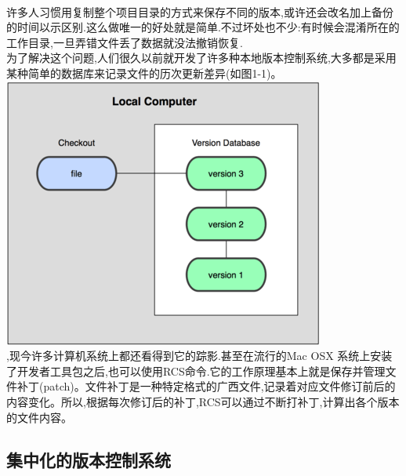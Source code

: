 \documentclass{book}
\begin{document}
	\paragraph{}
许多人习惯用复制整个项目目录的方式来保存不同的版本,或许还会改名加上备份的时间以示区别.这么做唯一的好处就是简单.不过坏处也不少:有时候会混淆所在的工作目录,一旦弄错文件丢了数据就没法撤销恢复.\\
	为了解决这个问题,人们很久以前就开发了许多种本地版本控制系统,大多都是采用某种简单的数据库来记录文件的历次更新差异(如图1-1)。\\
	\includegraphics{1-1.png}\\
	,现今许多计算机系统上都还看得到它的踪影.甚至在流行的Mac OSX 系统上安装了开发者工具包之后,也可以使用RCS命令.它的工作原理基本上就是保存并管理文件补丁(patch)。文件补丁是一种特定格式的广西文件,记录着对应文件修订前后的内容变化。所以,根据每次修订后的补丁,RCS可以通过不断打补丁,计算出各个版本的文件内容。\\
	\subsection{集中化的版本控制系统}
\end{document}
